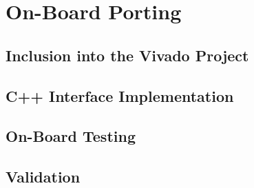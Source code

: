 
\chapter{On-Board Porting} %

\label{Chapter4} %



\section{Inclusion into the Vivado Project}


\section{C++ Interface Implementation}

\section{On-Board Testing}

\section{Validation}
